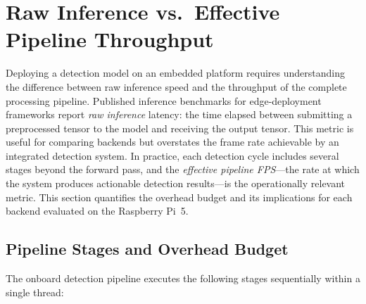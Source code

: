 
\section{Raw Inference vs.\ Effective Pipeline Throughput}\label{sec:cv:pipeline-fps}

Deploying a detection model on an embedded platform requires understanding the difference between raw inference speed and the throughput of the complete processing pipeline.  Published inference benchmarks for edge-deployment frameworks report \emph{raw inference} latency: the time elapsed between submitting a preprocessed tensor to the model and receiving the output tensor.  This metric is useful for comparing backends but overstates the frame rate achievable by an integrated detection system.  In practice, each detection cycle includes several stages beyond the forward pass, and the \emph{effective pipeline FPS}---the rate at which the system produces actionable detection results---is the operationally relevant metric.  This section quantifies the overhead budget and its implications for each backend evaluated on the Raspberry Pi~5.

\subsection{Pipeline Stages and Overhead Budget}\label{sec:cv:pipeline-fps:stages}

The onboard detection pipeline executes the following stages sequentially within a single thread:

